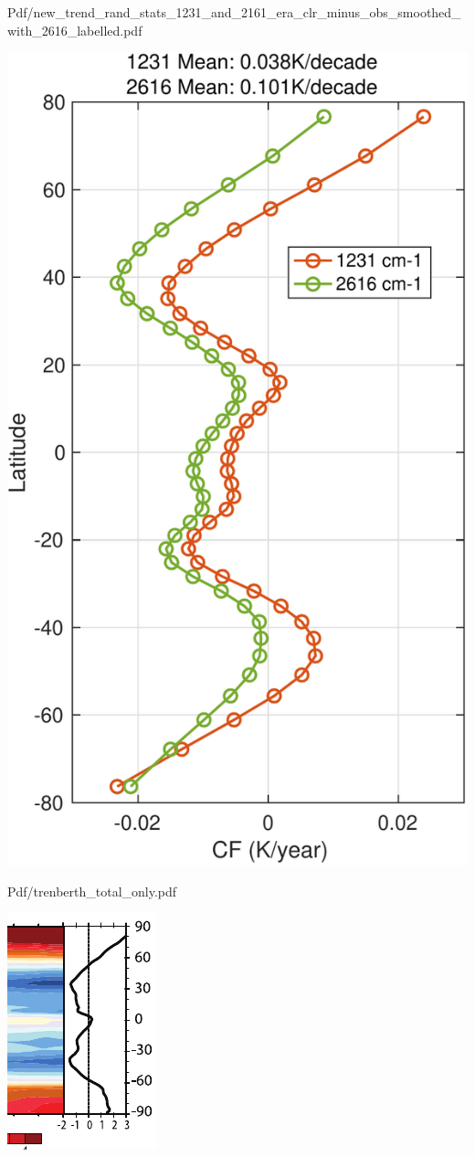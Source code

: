 \documentclass[10pt,t]{beamer}
\begin{document}
\begin{frame}[label={sec:org6a936c9}]{Pdf/new\_trend\_rand\_stats\_1231\_and\_2161\_era\_clr\_minus\_obs\_smoothed\_with\_2616\_labelled.pdf}
\begin{center}
\includegraphics[width=0.4\linewidth]{./Figs/Pdf/new_trend_rand_stats_1231_and_2161_era_clr_minus_obs_smoothed_with_2616_labelled.pdf}
\end{center}
\end{frame}
\begin{frame}[label={sec:org45ac550}]{Pdf/trenberth\_total\_only.pdf}
\begin{center}
\includegraphics[width=0.7\linewidth]{./Figs/Pdf/trenberth_total_only.pdf}
\end{center}
\end{frame}
\end{document}
